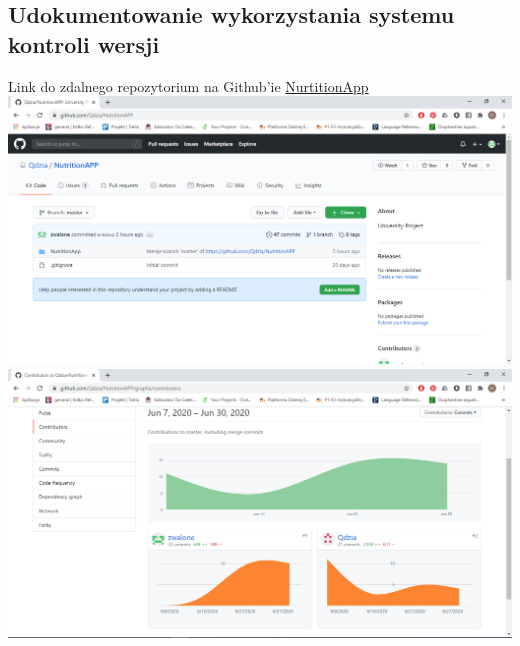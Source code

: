 \documentclass[12pt,a4paper]{article}
\begin{document}
	
	\subsection*{Udokumentowanie wykorzystania systemu kontroli wersji}
	Link do zdalnego repozytorium na Github'ie \href{https://github.com/Qdzia/NutritionAPP}{NurtitionApp} \\
	
	\includegraphics[scale = 0.5]{img/Git1.png}\\ 
	\includegraphics[scale = 0.5]{img/Git2.png} 
	
\end{document}
